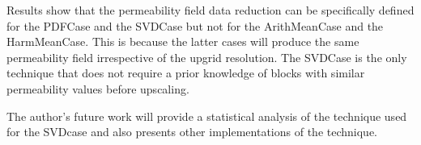 \documentclass[preprint,12pt]{elsarticle}
\begin{document}
Results show that the permeability field data reduction can be specifically defined for the PDFCase and the SVDCase but not for the ArithMeanCase and the HarmMeanCase. This is because the latter cases will produce the same permeability field irrespective of the upgrid resolution. The SVDCase is the only technique that does not require a prior knowledge of blocks with similar permeability values before upscaling.

The author's future work will provide a statistical analysis of the technique used for the SVDcase and also presents other implementations of the technique.



\clearpage 
 
%
%

  
\clearpage 

%
\clearpage  
\listoffigures
\clearpage
 
\end{document}

